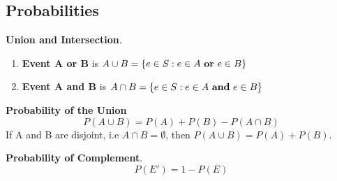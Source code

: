 \documentclass[14pt]{extarticle}
\begin{document}
\subsection{Probabilities}
\begin{tcolorbox}[enhanced jigsaw,colback=bg,boxrule=0pt,arc=0pt] 
	\textbf{Union and Intersection}.
	\begin{enumerate}
		\item \textbf{Event A or B} is $A\cup B = \{e \in S : e \in A \text{ \textbf{or} } e \in B\}$
		\item \textbf{Event A and B} is $A\cap B = \{e \in S : e \in A \text{ \textbf{and} } e \in B\}$
	\end{enumerate}
	\textbf{Probability of the Union}
	$$ P(A\cup B)= P(A) + P(B) -P(A\cap B)$$
	If A and B are disjoint, i.e $A\cap B = \emptyset$, then $P(A\cup B) = P(A) + P(B)$.
\end{tcolorbox}
\begin{tcolorbox}[enhanced jigsaw,colback=bg,boxrule=0pt,arc=0pt] 
	\textbf{Probability of Complement}.
	$$ P(E')= 1-P(E) $$
\end{tcolorbox}
\end{document}
